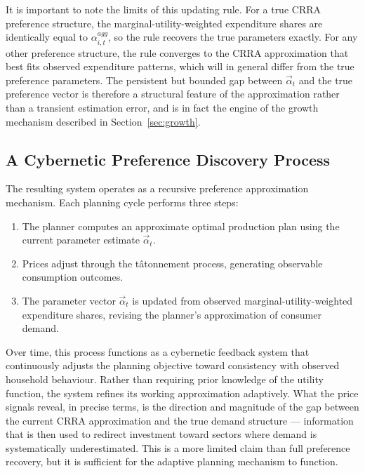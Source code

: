 It is important to note the limits of this updating rule. For a true
CRRA preference structure, the marginal-utility-weighted expenditure
shares are identically equal to $\alpha^{agg}_{i,t}$, so the rule
recovers the true parameters exactly. For any other preference
structure, the rule converges to the CRRA approximation that best fits
observed expenditure patterns, which will in general differ from the
true preference parameters. The persistent but bounded gap between
$\vec{\alpha}_t$ and the true preference vector is therefore a
structural feature of the approximation rather than a transient
estimation error, and is in fact the engine of the growth mechanism
described in Section~\ref{sec:growth}.

\subsection{A Cybernetic Preference Discovery Process}

The resulting system operates as a recursive preference approximation
mechanism. Each planning cycle performs three steps:

\begin{enumerate}
\item The planner computes an approximate optimal production plan
  using the current parameter estimate $\vec{\alpha}_t$.
\item Prices adjust through the t\^{a}tonnement process, generating
  observable consumption outcomes.
\item The parameter vector $\vec{\alpha}_t$ is updated from observed
  marginal-utility-weighted expenditure shares, revising the planner's
  approximation of consumer demand.
\end{enumerate}

Over time, this process functions as a cybernetic feedback system that
continuously adjusts the planning objective toward consistency with
observed household behaviour. Rather than requiring prior knowledge of
the utility function, the system refines its working approximation
adaptively. What the price signals reveal, in precise terms, is the
direction and magnitude of the gap between the current CRRA
approximation and the true demand structure --- information that is
then used to redirect investment toward sectors where demand is
systematically underestimated. This is a more limited claim than full
preference recovery, but it is sufficient for the adaptive planning
mechanism to function.
